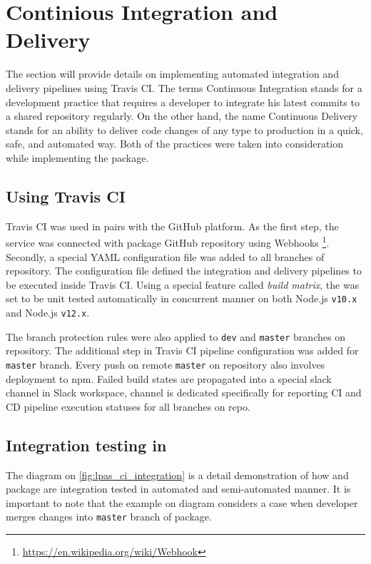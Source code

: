 \section{Continious Integration and Delivery}
\label{ssec:integration_and_delivery}

The section will provide details on implementing automated integration and delivery pipelines using Travis CI.
The terms Continuous Integration stands for a development practice that requires a developer to integrate his latest commits to a shared repository regularly. On the other hand, the name Continuous Delivery stands for an ability to deliver code changes of any type to production in a quick, safe, and automated way. Both of the practices were taken into consideration while implementing the \lpas{} package. 

\subsection{Using Travis CI}
\label{ssec:travis_ci_lpa}

Travis CI was used in pairs with the GitHub platform. As the first step, the service was connected with \lpas{} package GitHub repository using Webhooks \footnote{\url{https://en.wikipedia.org/wiki/Webhook}}. Secondly, a special YAML configuration file was added to all branches of \lpas{} repository. The configuration file defined the integration and delivery pipelines to be executed inside Travis CI. Using a special feature called \textit{build matrix}, the \lpas{} was set to be unit tested automatically in concurrent manner on both Node.js \texttt{v10.x} and Node.js \texttt{v12.x}. 

The branch protection rules were also applied to \texttt{dev} and \texttt{master} branches on \lpas{} repository. The additional step in Travis CI pipeline configuration was added for \texttt{master} branch. Every push on remote \texttt{master} on \lpas{} repository also involves deployment to npm. Failed build states are propagated into a special slack channel in \lpa{} Slack workspace, channel is dedicated specifically for reporting CI and CD pipeline execution statuses for all branches on \lpas{} repo.

\subsection{Integration testing in \lpa{}}

The diagram on \autoref{fig:lpas_ci_integration} is a detail demonstration of how \lpa{} and \lpa{} package are integration tested in automated and semi-automated manner. It is important to note that the example on diagram considers a case when \lpas{} developer merges changes into \texttt{master} branch of \lpas{} package.

